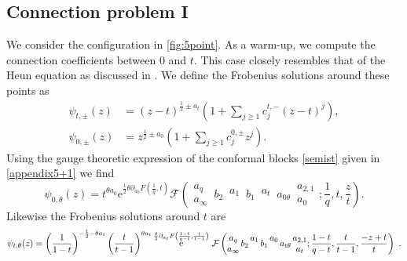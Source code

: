 \documentclass[11pt]{article}
\numberwithin{equation}{section}
\newcommand{\be}{\begin{equation}}
\newcommand{\ee}{\end{equation}}
\newcommand{\ri}{{\rm i}}
\newcommand{\E}{{\mathrm e}}
\DeclareMathOperator{\re}{{\rm e}}
\begin{document}
\subsection{Connection problem I}\label{conn1}
We consider the configuration in \autoref{fig:5point}. As a warm-up, we  compute the connection coefficients between $0$ and $t$. This case closely resembles that of the Heun equation as discussed in \cite{Jia:2024zes,Lisovyy:2022flm, Liu:2024eut}.
We define the Frobenius solutions around these points as
\begin{equation}\label{frobenius0andt}
\begin{aligned}
\psi_{t,\pm}(z)&=(z-t)^{\frac{1}{2}\pm a_t}\left(1+\sum_{j\ge 1}c^{t,-}_{j}(z-t)^j\right),\\
\psi_{0,\pm}(z)&=z^{\frac{1}{2}\pm a_0}\left(1+\sum_{j\ge 1}c^{0,\pm}_{j}z^j\right).
\end{aligned}
\end{equation}
%
Using the gauge theoretic expression of the conformal blocks \eqref{semist} given in \autoref{appendix5+1} we find 
\be \psi_{0,\theta}(z)=t^{\theta a_{0} }\E^{\frac1 2\theta\partial_{a_0}F\left(\frac1 q , t\right)}\mathcal{F}\left(\begin{matrix}a_q\\ a_{\infty}\end{matrix}\,b_2\,\begin{matrix}a_1\\ {}\end{matrix}\,b_1\,\begin{matrix} a_t\\ {}\end{matrix}\,a_{0\theta}\,\begin{matrix}a_{2,1}\\ a_{0}\end{matrix};\frac{1}{q},t,\frac{z}{t}\right). \ee
Likewise the Frobenius solutions around $t$ are
\be \psi_{t,\theta}(z)=
\left(\frac{1}{1-t}\right)^{-\frac 1 2-\theta a_t}\left(\frac{t}{t-1}\right)^{\theta a_{t} }\re^{\frac{\theta}{2}\partial_{a_t}F\left({1-t\over q-t},\frac{t}{t-1}\right)}\,\mathcal{F}\left( \begin{matrix} a_{q} \\ a_{\infty} \end{matrix} \, b_2 \, \begin{matrix} a_1  \\ \, \end{matrix} \,b_1 \, \begin{matrix} a_0 \\ \, \end{matrix} \,a_{t\theta} \, \begin{matrix} a_{2,1} \\ a_t \end{matrix} ; \frac{1-t}{q-t}, \frac{t}{t-1}, \frac{-z+t}{t} \right)~.\ee
\end{document}
